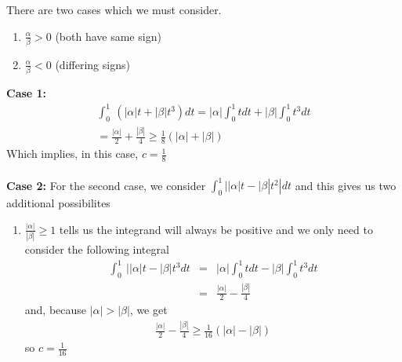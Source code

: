 \documentclass[11pt]{SelfArxOneColBMN}
\begin{document}
\begin{solution}
  \noindent There are two cases which we must consider.
  \begin{enumerate}
    \item $\frac{\alpha}{\beta} > 0$ (both have same sign)
    \item $\frac{\alpha}{\beta} < 0$ (differing signs)
  \end{enumerate}
  \textbf{Case 1:}
  \begin{eqnarray*}
    \int_0^1 \: ( |\alpha| t + |\beta| t^3) dt
    = |\alpha|\int_0^1 tdt + |\beta|\int_0^1t^3dt\\
   = \frac{|\alpha|}{2} + \frac{|\beta|}{4}
    \geq \frac{1}{8}(|\alpha| + |\beta|)
  \end{eqnarray*}
  Which implies, in this case, $c = \frac{1}{8}$\\
  \\
  \textbf{Case 2: }
  For the second case, we consider $\int_0^1 ||\alpha|t - |\beta|t^2 |dt$ and this gives us two additional possibilites
  \begin{enumerate}
    \item $\frac{|\alpha|}{|\beta|} \geq 1$ tells us the integrand will always be positive and we only need to consider the following integral
    \begin{eqnarray*}
      \int_0^1 \:||\alpha|t - |\beta|t^3 dt &=& |\alpha|\int_0^1 tdt - |\beta|\int_0^1 t^3 dt\\
      &=&
      \frac{|\alpha|}{2} - \frac{|\beta|}{4}
    \end{eqnarray*}
    and, because $|\alpha| > |\beta|$, we get
    \begin{eqnarray*}
      \frac{|\alpha|}{2} - \frac{|\beta|}{4} \geq \frac{1}{16}(|\alpha| - |\beta|)
    \end{eqnarray*}
    so $c = \frac{1}{16}$
    

\end{enumerate}
\end{solution}
\end{document}
